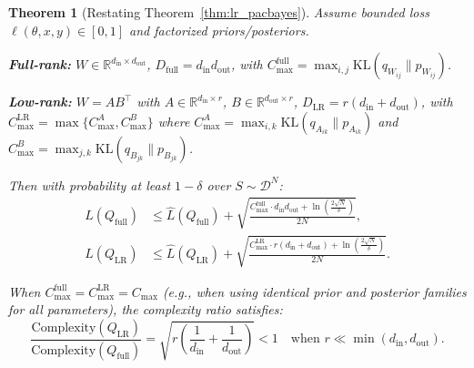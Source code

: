 \documentclass{article}
\theoremstyle{plain}
\newtheorem{theorem}{Theorem}[section]
\theoremstyle{definition}
\theoremstyle{remark}
\begin{document}
\begin{theorem}[Restating Theorem~\ref{thm:lr_pacbayes}]
Assume bounded loss $\ell(\theta, x, y) \in [0,1]$ and factorized priors/posteriors.

\textbf{Full-rank:} $W \in \mathbb{R}^{d_{\text{in}} \times d_{\text{out}}}$, $D_{\text{full}} = d_{\text{in}} d_{\text{out}}$, with $C_{\max}^{\text{full}} = \max_{i,j} \mathrm{KL}(q_{W_{ij}} \| p_{W_{ij}})$.

\textbf{Low-rank:} $W = AB^\top$ with $A \in \mathbb{R}^{d_{\text{in}} \times r}$, $B \in \mathbb{R}^{d_{\text{out}} \times r}$, $D_{\text{LR}} = r(d_{\text{in}} + d_{\text{out}})$, with $C_{\max}^{\text{LR}} = \max\{C_{\max}^A, C_{\max}^B\}$ where $C_{\max}^A = \max_{i,k} \mathrm{KL}(q_{A_{ik}} \| p_{A_{ik}})$ and $C_{\max}^B = \max_{j,k} \mathrm{KL}(q_{B_{jk}} \| p_{B_{jk}})$.

Then with probability at least $1-\delta$ over $S \sim \mathcal{D}^N$:
\begin{align*}
L(Q_{\text{full}}) 
&\leq \hat{L}(Q_{\text{full}}) 
+ \sqrt{\frac{C_{\max}^{\text{full}} \cdot d_{\text{in}}d_{\text{out}} + \ln\left(\frac{2\sqrt{N}}{\delta}\right)}{2N}}, \\
L(Q_{\text{LR}}) 
&\leq \hat{L}(Q_{\text{LR}}) 
+ \sqrt{\frac{C_{\max}^{\text{LR}} \cdot r(d_{\text{in}} + d_{\text{out}}) + \ln\left(\frac{2\sqrt{N}}{\delta}\right)}{2N}}.
\end{align*}

When $C_{\max}^{\text{full}} = C_{\max}^{\text{LR}} = C_{\max}$ (e.g., when using identical prior and posterior families for all parameters), the complexity ratio satisfies:
\[
\frac{\text{Complexity}(Q_{\text{LR}})}{\text{Complexity}(Q_{\text{full}})} 
= \sqrt{r\left(\frac{1}{d_{\text{in}}} + \frac{1}{d_{\text{out}}}\right)} < 1
\quad \text{when } r \ll \min(d_{\text{in}}, d_{\text{out}}).
\]
\end{theorem}
\end{document}
